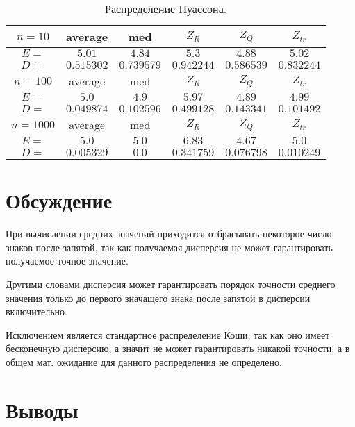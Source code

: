 \documentclass[a4]{article}
\begin{document}
\begin{table}[H]
\caption{\label{tab:poisson} Распределение Пуассона.}
\begin{center}
\begin{tabular}{|c|c|c|c|c|c|}
\hline
$n = 10$   & average & med & $Z_R$ & $Z_Q$ & $Z_{tr}$\\ \hline
$E =$ & $5.01$ &  $4.84$ &  $5.3$ &  $4.88$ &  $5.02$    \\ \hline
$D =$ & $0.515302$ &  $0.739579$ &  $0.942244$ &  $0.586539$ &  $0.832244$    \\ \hline
					
$n = 100$   & average & med & $Z_R$ & $Z_Q$ & $Z_{tr}$\\ \hline
$E =$ & $5.0$ &  $4.9$ &  $5.97$ &  $4.89$ &  $4.99$ \\ \hline
$D =$ &	$0.049874$ &  $0.102596$ &  $0.499128$ &  $0.143341$ &  $0.101492$ \\ \hline
					
$n = 1000$   & average & med & $Z_R$ & $Z_Q$ & $Z_{tr}$\\ \hline
$E =$ & $5.0$ &  $5.0$ &  $6.83$ &  $4.67$ &  $5.0$    \\ \hline
$D =$ & $0.005329$ &  $0.0$ &  $0.341759$ &  $0.076798$ &  $0.010249$    \\
\hline
\end{tabular}
\end{center}
\end{table}


\section{Обсуждение}
\par При вычислении средних значений приходится отбрасывать некоторое число знаков после запятой, так как получаемая дисперсия не может гарантировать получаемое точное значение. \par Другими словами дисперсия может гарантировать порядок точности среднего значения только до первого значащего знака после запятой в дисперсии включительно. \par Исключением является стандартное распределение Коши, так как оно имеет бесконечную дисперсию, а значит не может гарантировать никакой точности, а в общем мат. ожидание для данного распределения не определено.

\section{Выводы}
\end{document}
